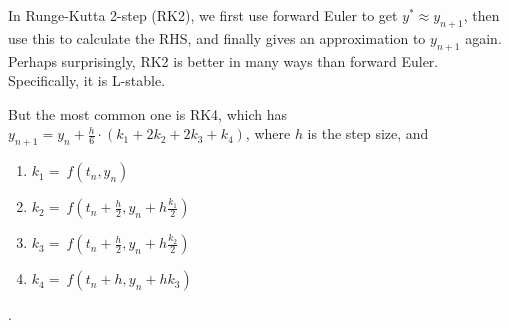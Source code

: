 \documentclass[a4paper,twocolumn,enumboxcolor=cyan!50,10pt]{onepgnote}
\begin{document}
In Runge-Kutta 2-step (RK2),
we first use forward Euler to get $y^* \approx y_{n+1}$, then use this to
calculate the RHS, and finally gives an approximation to $y_{n+1}$ again.
Perhaps surprisingly, RK2 is better in many ways than forward Euler.
Specifically, it is L-stable.

But the most common one is RK4, which has $y_{n+1} = y_n +
\frac{h}{6}\cdot\allowbreak\left(k_1 + 2k_2 + 2k_3 + k_4 \right)$, where $h$ is
the step size, and 
\begin{enumerate}
\item
$k_1 = \ f(t_n,\allowbreak y_n)$
\item
$k_2 = \ f\!\left(t_n + \frac{h}{2},\allowbreak y_n + h \frac{k_1}{2}\right)$
\item
$k_3 = \ f\!\left(t_n + \frac{h}{2},\allowbreak y_n + h \frac{k_2}{2}\right)$
\item
$k_4 = \ f\!\left(t_n + h,\allowbreak y_n + h k_3\right)$
\end{enumerate}.
\end{document}
